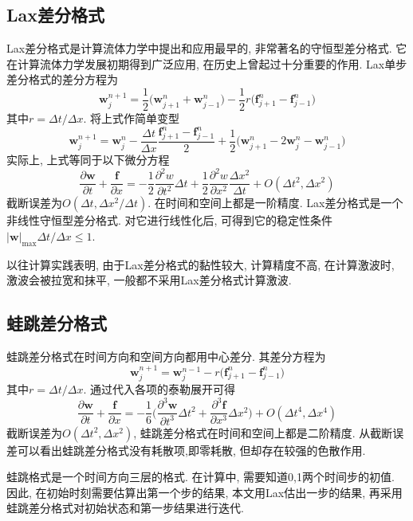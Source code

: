 \documentclass[a4paper,boxed]{caspset}
\begin{document}
\subsection{Lax差分格式}
Lax差分格式是计算流体力学中提出和应用最早的, 非常著名的守恒型差分格式. 它在计算流体力学发展初期得到广泛应用, 在历史上曾起过十分重要的作用. Lax单步差分格式的差分方程为
\[
\mathbf{w}_{j}^{n+1}=\frac{1}{2}\big(\mathbf{w}_{j+1}^{n}+\mathbf{w}_{j-1}^{n}\big)-\frac{1}{2}r\big(\mathbf{f}_{j+1}^{n}-\mathbf{f}_{j-1}^{n}\big)
\]
其中$r=\Delta t/\Delta x$. 将上式作简单变型
\[
\mathbf{w}_{j}^{n+1} = \mathbf{w}_{j}^{n}
- \frac{\Delta t}{\Delta x} \frac{\mathbf{f}_{j+1}^{n}-\mathbf{f}_{j-1}^{n}}{2}
+\frac{1}{2}\big(\mathbf{w}_{j+1}^{n} -2 \mathbf{w}_{j}^{n}- \mathbf{w}_{j-1}^{n}\big)
\]
实际上, 上式等同于以下微分方程
\[
\frac{\partial\mathbf{w}}{\partial t} + \frac{\mathbf{f}}{\partial x} =
-\frac{1}{2}\frac{\partial^2 w}{\partial t^2}\Delta t
+ \frac{1}{2}\frac{\partial^2 w}{\partial x^2}
\frac{\Delta x^2}{\Delta t} +O(\Delta t^2, \Delta x^2)
\]
截断误差为$O(\Delta t, \Delta x^2/\Delta t)$. 在时间和空间上都是一阶精度. Lax差分格式是一个非线性守恒型差分格式. 对它进行线性化后, 可得到它的稳定性条件$|\mathbf{w}|_{\max}\Delta t/\Delta x\leq 1$.

以往计算实践表明, 由于Lax差分格式的黏性较大, 计算精度不高, 在计算激波时, 激波会被拉宽和抹平, 一般都不采用Lax差分格式计算激波.

\subsection{蛙跳差分格式}

蛙跳差分格式在时间方向和空间方向都用中心差分. 其差分方程为
\[
\mathbf{w}_{j}^{n+1}= \mathbf{w}_{j}^{n-1} - r\big(\mathbf{f}_{j+1}^{n}-\mathbf{f}_{j-1}^{n}\big)
\]
其中$r=\Delta t/\Delta x$. 通过代入各项的泰勒展开可得
\[
\frac{\partial\mathbf{w}}{\partial t} + \frac{\mathbf{f}}{\partial x} =
-\frac{1}{6}\Big(\frac{\partial^3\mathbf{w}}{\partial t^3}\Delta t^2+\frac{\partial^3\mathbf{f}}{\partial x^3}\Delta x^2\Big) + O(\Delta t^4, \Delta x^4)
\]
截断误差为$O(\Delta t^2, \Delta x^2)$, 蛙跳差分格式在时间和空间上都是二阶精度.
从截断误差可以看出蛙跳差分格式没有耗散项,即零耗散, 但却存在较强的色散作用.

蛙跳格式是一个时间方向三层的格式. 在计算中, 需要知道0,1两个时间步的初值. 因此, 在初始时刻需要估算出第一个步的结果, 本文用Lax估出一步的结果, 再采用蛙跳差分格式对初始状态和第一步结果进行迭代.
\end{document}
